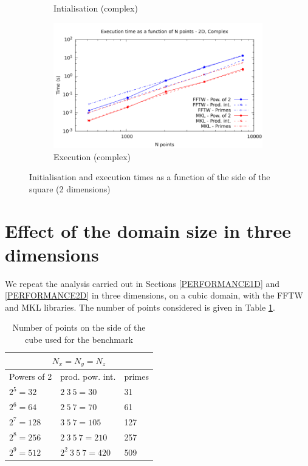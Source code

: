 \documentclass[12pt, a4paper]{article}
\begin{document}
\begin{figure}[H]
\begin{subfigure}{.5\textwidth}
\caption{Intialisation (complex)}
\label{2DCI}
\end{subfigure}%
\begin{subfigure}{.5\textwidth}
\centering
\includegraphics[width=.9\linewidth]{graphs/2d-exec-c.pdf}
\caption{Execution (complex)}
\label{2DC}
\end{subfigure}
\caption{Initialisation and execution times as a function of the side of the square (2 dimensions)}
\label{2D}
\end{figure}

\section{Effect of the domain size in three dimensions}\label{PERFORMANCE3D}

We repeat the analysis carried out in Sections \ref{PERFORMANCE1D} and \ref{PERFORMANCE2D} in three dimensions, on a cubic domain, with  the FFTW and MKL libraries. The number of points considered is given in Table \ref{SIZES3D}.

\begin{table}[H]
\captionsetup{width=0.85\linewidth}
\centering
\begin{tabular}{|l|l|l|}
  \hline
  \multicolumn{3}{|c|}{$N_x=N_y=N_z$}\\
  \hline
  \hline
  Powers of 2 & prod. pow. int. & primes\\ \hline
$2^5=32$ & $2\ 3\ 5=30$	& 31\\ \hline
$2^6=64$ & $2\ 5\ 7=70$	& 61\\ \hline
$2^7=128$ & $3\ 5\ 7=105$ & 127\\ \hline
$2^8=256$ & $2\ 3\ 5\ 7=210$ & 257\\ \hline
$2^9=512$ & $2^2\ 3\ 5\ 7=420$ & 509\\ \hline
\end{tabular}
\caption{Number of points on the side of the cube used for the benchmark}\label{SIZES3D}
\end{table}
\end{document}
